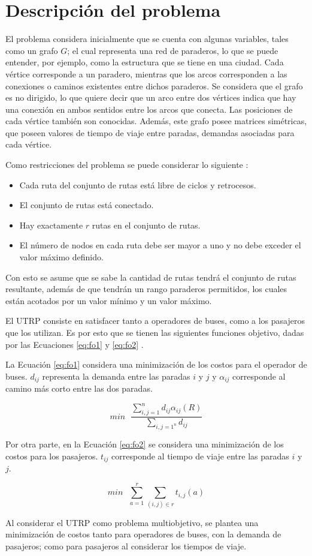 \section{Descripción del problema}

El problema considera inicialmente que se cuenta con algunas variables, tales como un grafo $G$; el cual representa una red de paraderos, lo que se puede entender, por ejemplo, como la estructura que se tiene en una ciudad. Cada vértice corresponde a un paradero, mientras que los arcos corresponden a las conexiones o caminos existentes entre dichos paraderos. Se considera que el grafo es no dirigido, lo que quiere decir que un arco entre dos vértices indica que hay una conexión en ambos sentidos entre los arcos que conecta. Las posiciones de cada vértice también son conocidas. Además, este grafo posee matrices simétricas, que poseen valores de tiempo de viaje entre paradas, demandas asociadas para cada vértice.

Como restricciones del problema se puede considerar lo siguiente \cite{NewHaEOps}:
\begin{itemize}
\item Cada ruta del conjunto de rutas está libre de ciclos y retrocesos.
\item El conjunto de rutas está conectado.
\item Hay exactamente $r$ rutas en el conjunto de rutas.
\item El número de nodos en cada ruta debe ser mayor a uno y no debe exceder el valor máximo definido.
\end{itemize} 

Con esto se asume que se sabe la cantidad de rutas tendrá el conjunto de rutas resultante, además de que tendrán un rango paraderos permitidos, los cuales están acotados por un valor mínimo y un valor máximo.

El UTRP consiste en satisfacer tanto a operadores de buses, como a los pasajeros que los utilizan. Es por esto que se tienen las siguientes funciones objetivo, dadas por las Ecuaciones \eqref{eq:fo1} y \eqref{eq:fo2} \cite{NewHaEOps}.

La Ecuación \eqref{eq:fo1} considera una minimización de los costos para el operador de buses. $d_{ij}$ representa la demanda  entre las paradas $i$ y $j$ y $\alpha_{ij}$ corresponde al camino más corto entre las dos paradas.

\begin{equation}
\label{eq:fo1}
min\mbox{ }\frac{\sum^n_{i,j=1}d_{ij}\alpha_{ij}(R)}{\sum_{i,j=1^n}d_{ij}}
\end{equation} 

Por otra parte, en la Ecuación \eqref{eq:fo2} se considera una minimización de los costos para los pasajeros. $t_{ij}$ corresponde al tiempo de viaje entre las paradas $i$ y $j$. 

\begin{equation}
\label{eq:fo2}
min\mbox{ }\sum^r_{a=1}\sum_{(i,j) \in r} t_{i,j} (a)
\end{equation} 

Al considerar el UTRP como problema multiobjetivo, se plantea una minimización de costos tanto para operadores de buses, con la demanda de pasajeros; como para pasajeros al considerar los tiempos de viaje.
